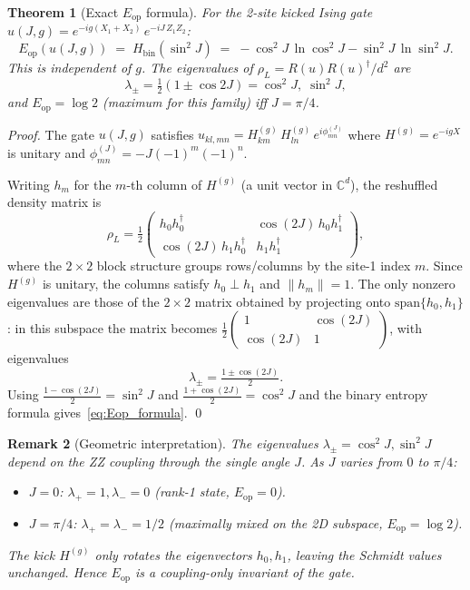 \documentclass[12pt,a4paper]{article}
\newtheorem{theorem}{Theorem}[section]
\newtheorem{remark}[theorem]{Remark}
\newcommand{\CC}{\mathbb{C}}
\begin{document}
\begin{theorem}[Exact $E_\mathrm{op}$ formula]\label{thm:Eop_formula}
For the 2-site kicked Ising gate $u(J,g) = e^{-ig(X_1+X_2)}\,e^{-iJ\,Z_1Z_2}$:
\begin{equation}\label{eq:Eop_formula}
  \boxed{E_\mathrm{op}(u(J,g)) \;=\; H_\mathrm{bin}(\sin^2 J)
  \;=\; -\cos^2\!J\,\ln\cos^2\!J - \sin^2\!J\,\ln\sin^2\!J.}
\end{equation}
This is \emph{independent of $g$}.
The eigenvalues of $\rho_L = R(u)R(u)^\dagger/d^2$ are
\begin{equation}
  \lambda_\pm = \tfrac{1}{2}(1\pm\cos 2J) = \cos^2 J,\;\sin^2 J,
\end{equation}
and $E_\mathrm{op} = \log 2$ (maximum for this family) iff $J=\pi/4$.
\end{theorem}
\begin{proof}
The gate $u(J,g)$ satisfies $u_{kl,mn} = H^{(g)}_{km}\,H^{(g)}_{ln}\,e^{i\phi_{mn}^{(J)}}$
where $H^{(g)} = e^{-igX}$ is unitary and $\phi_{mn}^{(J)} = -J(-1)^m(-1)^n$.

Writing $h_m$ for the $m$-th column of $H^{(g)}$ (a unit vector in $\CC^d$), the
reshuffled density matrix is
\begin{equation}
  \rho_L = \tfrac{1}{2}\begin{pmatrix}
    h_0 h_0^\dagger & \cos(2J)\, h_0 h_1^\dagger \\[2pt]
    \cos(2J)\, h_1 h_0^\dagger & h_1 h_1^\dagger
  \end{pmatrix},
\end{equation}
where the $2\times 2$ block structure groups rows/columns by the site-1 index $m$.
Since $H^{(g)}$ is unitary, the columns satisfy $h_0\perp h_1$ and $\|h_m\|=1$.
The only nonzero eigenvalues are those of the $2\times 2$ matrix obtained by
projecting onto $\mathrm{span}\{h_0,h_1\}$:
in this subspace the matrix becomes
$\frac{1}{2}\begin{pmatrix}1&\cos(2J)\\\cos(2J)&1\end{pmatrix}$,
with eigenvalues
\begin{equation}
  \lambda_\pm = \tfrac{1\pm\cos(2J)}{2}.
\end{equation}
Using $\tfrac{1-\cos(2J)}{2}=\sin^2 J$ and $\tfrac{1+\cos(2J)}{2}=\cos^2 J$
and the binary entropy formula gives~\eqref{eq:Eop_formula}. \qed
\end{proof}

\begin{remark}[Geometric interpretation]
The eigenvalues $\lambda_\pm = \cos^2 J, \sin^2 J$ depend on the ZZ coupling
through the single angle $J$.  As $J$ varies from $0$ to $\pi/4$:
\begin{itemize}
\item $J=0$: $\lambda_+ = 1, \lambda_- = 0$ (rank-1 state, $E_\mathrm{op}=0$).
\item $J=\pi/4$: $\lambda_+ = \lambda_- = 1/2$ (maximally mixed on the 2D subspace, $E_\mathrm{op}=\log 2$).
\end{itemize}
The kick $H^{(g)}$ only rotates the eigenvectors $h_0,h_1$, leaving the Schmidt
values unchanged.  Hence $E_\mathrm{op}$ is a \emph{coupling-only} invariant of the gate.
\end{remark}
\end{document}
